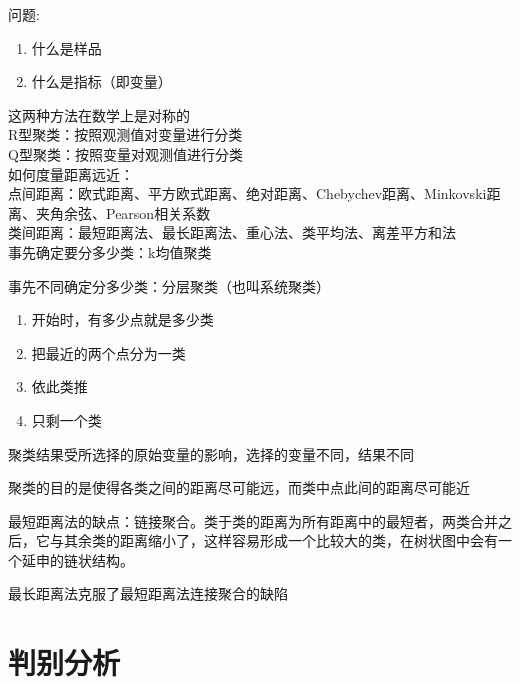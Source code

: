 \documentclass[UTF8,10pt]{book}
\begin{document}
问题:

\begin{enumerate}
	\def\labelenumi{\arabic{enumi}.}
	\item
	什么是样品
	\item
	什么是指标（即变量）
\end{enumerate}

这两种方法在数学上是对称的\\
R型聚类：按照观测值对变量进行分类\\
Q型聚类：按照变量对观测值进行分类\\


如何度量距离远近：\\
点间距离：欧式距离、平方欧式距离、绝对距离、Chebychev距离、Minkovski距离、夹角余弦、Pearson相关系数\\
类间距离：最短距离法、最长距离法、重心法、类平均法、离差平方和法\\


事先确定要分多少类：k均值聚类

事先不同确定分多少类：分层聚类（也叫系统聚类）


\begin{enumerate}
	\def\labelenumi{\arabic{enumi}.}
	\item
	开始时，有多少点就是多少类
	\item
	把最近的两个点分为一类
	\item
	依此类推
	\item
	只剩一个类
\end{enumerate}

聚类结果受所选择的原始变量的影响，选择的变量不同，结果不同

聚类的目的是使得各类之间的距离尽可能远，而类中点此间的距离尽可能近

最短距离法的缺点：链接聚合。类于类的距离为所有距离中的最短者，两类合并之后，它与其余类的距离缩小了，这样容易形成一个比较大的类，在树状图中会有一个延申的链状结构。

最长距离法克服了最短距离法连接聚合的缺陷

\section{判别分析 }\label{header-n49}
\end{document}
